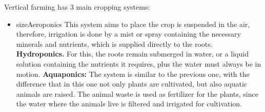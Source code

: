 \documentclass[10pt]{article}
\begin{document}
\newpage

\begin{mdframed}[backgroundcolor=NavyBlue!5,middlelinecolor=MidnightBlue,
                 middlelinewidth=2pt,shadow=false,roundcorner=3pt]
    Vertical farming has 3 main cropping systems:
    \begin{itemize}
        \item size{Aeroponics} This system aims to place the crop is suspended in the air, therefore, irrigation is done by a mist or spray containing the necessary minerals and nutrients, which is supplied directly to the roots.
        \textbf{Hydroponics.} For this, the roots remain submerged in water, or a liquid solution containing the nutrients it requires, plus the water must always be in motion. 
        \textbf{Aquaponics:} The system is similar to the previous one, with the difference that in this one not only plants are cultivated, but also aquatic animals are raised. The animal waste is used as fertilizer for the plants, since the water where the animals live is filtered and irrigated for cultivation. 
    \end{itemize}
    

\end{mdframed}
\end{document}
